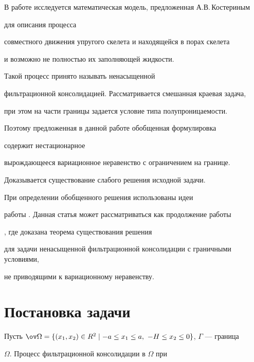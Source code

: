 \maketitle


\label{begin}








В работе исследуется математическая модель, предложенная А.В.\,Костериным


\cite{1} для описания процесса


совместного движения упругого скелета и находящейся в порах скелета


и возможно не полностью их заполняющей жидкости.


Такой процесс принято называть ненасыщенной


фильтрационной консолидацией. Рассматривается смешанная краевая задача,


при этом на части границы задается условие типа полупроницаемости.


Поэтому предложенная в данной работе обобщенная формулировка


содержит нестационарное


вырождающееся вариационное неравенство с ограничением на границе.


Доказывается существование слабого решения исходной задачи.


При определении обобщенного решения использованы идеи


работы \cite{2}. Данная статья может рассматриваться как продолжение работы


\cite{3}, где доказана теорема существования решения


для задачи ненасыщенной фильтрационной консолидации с граничными условиями,


не приводящими к вариационному неравенству.





\section{Постановка задачи}





Пусть $\ov \Omega = \{(x_{1},x_{2}) \in R^{2} \mid -a \leq


x_{1} \leq a, \ -H \leq x_{2} \leq 0 \}$, $\Gamma$ --- граница


$\Omega$. Процесс фильтрационной консолидации в $\Omega$ при


